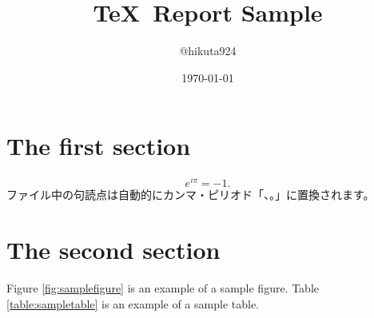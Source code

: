 
\title{\TeX\ Report Sample}
\author{@hikuta924}
\date{\today}

\maketitle

\section{The first section}
\begin{equation}
	e^{i \pi} = -1.
\end{equation}
ファイル中の句読点は自動的にカンマ・ピリオド「、。」に置換されます。

\section{The second section}
Figure \ref{fig:samplefigure} is an example of a sample figure.
Table \ref{table:sampletable} is an example of a sample table.


\cite{Sam2014}



